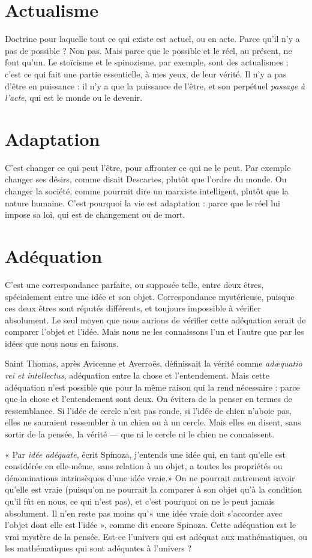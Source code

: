 \section{Actualisme}
Doctrine pour laquelle tout ce qui existe est actuel, ou en acte.
Parce qu’il n’y a pas de possible ? Non pas. Mais parce que le
possible et le réel, au présent, ne font qu’un. Le stoïcisme et le spinozisme, par
exemple, sont des actualismes ; c’est ce qui fait une partie essentielle, à mes
yeux, de leur vérité. Il n’y a pas d’être en puissance : il n’y a que la puissance de
l'être, et son perpétuel {\it passage à l'acte}, qui est le monde ou le devenir.

\section{Adaptation}
C’est changer ce qui peut l'être, pour affronter ce qui ne le
peut. Par exemple changer ses désirs, comme disait Descartes,
plutôt que l’ordre du monde. Ou changer la société, comme pourrait
dire un marxiste intelligent, plutôt que la nature humaine.
C’est pourquoi la vie est adaptation : parce que le réel lui impose sa loi, qui
est de changement ou de mort.

\section{Adéquation}
C’est une correspondance parfaite, ou supposée telle, entre
deux êtres, spécialement entre une idée et son objet. Correspondance
mystérieuse, puisque ces deux êtres sont réputés différents, et toujours
impossible à vérifier absolument. Le seul moyen que nous aurions de vérifier
cette adéquation serait de comparer l’objet et l’idée. Mais nous ne les
connaissons l’un et l’autre que par les idées que nous nous en faisons.

Saint Thomas, après Avicenne et Averroës, définissait la vérité comme {\it ad{\ae}quatio
rei et intellectus}, adéquation entre la chose et l’entendement. Mais cette
adéquation n’est possible que pour la même raison qui la rend nécessaire :
parce que la chose et l’entendement sont deux. On évitera de la penser en
termes de ressemblance. Si l’idée de cercle n’est pas ronde, si l’idée de chien
n’aboie pas, elles ne sauraient ressembler à un chien ou à un cercle. Mais elles en
disent, sans sortir de la pensée, la vérité — que ni le cercle ni le chien ne
connaissent.

« Par {\it idée adéquate}, écrit Spinoza, j'entends une idée qui, en tant qu’elle est
considérée en elle-même, sans relation à un objet, a toutes les propriétés ou
dénominations intrinsèques d’une idée vraie.» On ne pourrait autrement
savoir qu’elle est vraie (puisqu'on ne pourrait la comparer à son objet qu’à la
condition qu’il fût en nous, ce qui n’est pas), et c’est pourquoi on ne le peut
jamais absolument. Il n’en reste pas moins qu’« une idée vraie doit s’accorder
avec l’objet dont elle est l’idée », comme dit encore Spinoza. Cette adéquation
est le vrai mystère de la pensée. Est-ce l’univers qui est adéquat aux mathématiques,
ou les mathématiques qui sont adéquates à l’univers ?

